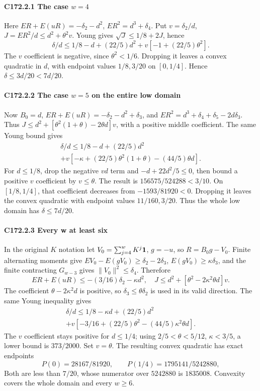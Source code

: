 \paragraph{C172.2.1 The case \(w=4\)}

Here \(ER+E(uR)=-\delta_2-d^2\), \(ER^2=d^3+\delta_4\). Put \(v=\delta_2/d\), \(J=ER^2/d\le d^2+\theta^2v\). Young gives \(\sqrt J\le1/8+2J\), hence
\[
\delta/d\le1/8-d+(22/5)d^2+v[-1+(22/5)\theta^2].
\]
The \(v\) coefficient is negative, since \(\theta^2<1/6\). Dropping it leaves a convex quadratic in \(d\), with endpoint values \(1/8,\allowbreak \allowbreak  3/20\) on \([0,\allowbreak \allowbreak  1/4]\). Hence \(\delta\le3d/20<7d/20\).

\paragraph{C172.2.2 The case \(w=5\) on the entire low domain}

Now \(B_0=d\), \(ER+E(uR)=-\delta_2-d^2+\delta_3\), and \(ER^2=d^3+\delta_4+\delta_5-2d\delta_3\). Thus \(J\le d^2+[\theta^2(1+\theta)-2\theta d]v\), with a positive middle coefficient. The same Young bound gives
\[
\begin{gathered}
\delta/d\le1/8-d+(22/5)d^2\\
+v[-\kappa+(22/5)\theta^2(1+\theta)-(44/5)\theta d].
\end{gathered}\tag{C172.T179.12}
\]
For \(d\le1/8\), drop the negative \(vd\) term and \(-d+22d^2/5\le0\), then bound a positive \(v\) coefficient by \(v\le\theta\). The result is \(156575/524288<3/10\). On \([1/8,\allowbreak \allowbreak  1/4]\), that coefficient decreases from \(-1593/81920<0\). Dropping it leaves the convex quadratic with endpoint values \(11/160,\allowbreak \allowbreak  3/20\). Thus the whole low domain has \(\delta\le7d/20\).

\paragraph{C172.2.3 Every w at least six}

In the original \(K\) notation let \(V_0=\sum_{j=4}^wK^j\mathbf1\), \(g=-u\), so \(R=B_0g-V_0\). Finite alternating moments give \(EV_0-E(gV_0)\ge \delta_2-2\delta_3\), \(E(gV_0)\ge\kappa \delta_3\), and the finite contracting \(G_{w-3}\) gives \(\|V_0\|^2\le \delta_4\). Therefore
\[
ER+E(uR)\le-(3/16)\delta_2-\kappa d^2,
\quad J\le d^2+[\theta^2-2\kappa^2\theta d]v.
\]
The coefficient \(\theta-2\kappa^2d\) is positive, so \(\delta_3\le\theta \delta_2\) is used in its valid direction. The same Young inequality gives
\[
\begin{gathered}
\delta/d\le1/8-\kappa d+(22/5)d^2\\
+v[-3/16+(22/5)\theta^2-(44/5)\kappa^2\theta d].
\end{gathered}\tag{C172.T179.13}
\]
The \(v\) coefficient stays positive for \(d\le1/4\); using \(2/5<\theta<5/12\), \(\kappa<3/5\), a lower bound is \(373/2000\). Set \(v=\theta\). The resulting convex quadratic has exact endpoints
\[
P(0)=28167/81920,
\qquad P(1/4)=1795141/5242880,
\]
Both are less than \(7/20\), whose numerator over \(5242880\) is \(1835008\). Convexity covers the whole domain and every \(w\ge6\).

